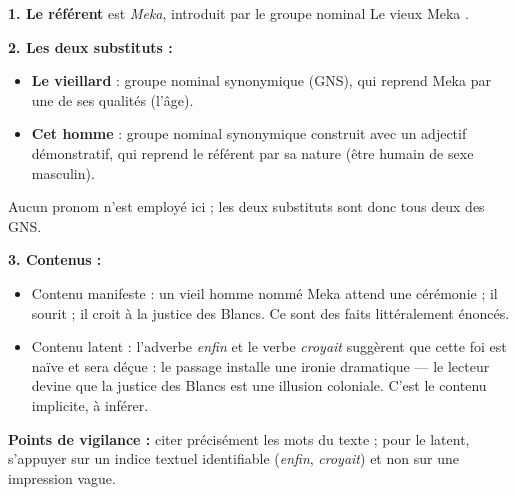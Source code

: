 \documentclass[11pt]{article}
\newcommand{\cle}[1]{{\popxbold\color{popdark}#1}}
\begin{document}
\begin{corrige}
\textbf{1. Le référent} est \emph{Meka}, introduit par le groupe nominal \og Le vieux Meka \fg{}.

\textbf{2. Les deux substituts :}
\begin{itemize}
\item \og \textbf{Le vieillard} \fg{} : \cle{groupe nominal synonymique} (GNS), qui reprend Meka par une de ses qualités (l'âge).
\item \og \textbf{Cet homme} \fg{} : \cle{groupe nominal synonymique} construit avec un adjectif démonstratif, qui reprend le référent par sa nature (être humain de sexe masculin).
\end{itemize}
Aucun pronom n'est employé ici ; les deux substituts sont donc tous deux des GNS.

\textbf{3. Contenus :}
\begin{itemize}
\item \cle{Contenu manifeste} : un vieil homme nommé Meka attend une cérémonie ; il sourit ; il croit à la justice des Blancs. Ce sont des faits littéralement énoncés.
\item \cle{Contenu latent} : l'adverbe \emph{enfin} et le verbe \emph{croyait} suggèrent que cette foi est naïve et sera déçue : le passage installe une \cle{ironie dramatique} — le lecteur devine que la \og justice des Blancs \fg{} est une illusion coloniale. C'est le contenu implicite, à inférer.
\end{itemize}
\textbf{Points de vigilance :} citer précisément les mots du texte ; pour le latent, s'appuyer sur un indice textuel identifiable (\emph{enfin}, \emph{croyait}) et non sur une impression vague.
\end{corrige}
\end{document}
